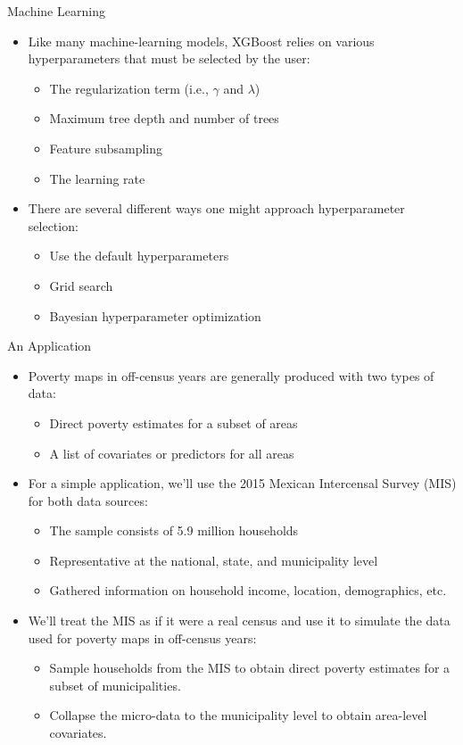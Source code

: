 \documentclass[aspectratio=169, xcolor=dvipsnames]{beamer}
\begin{document}
\begin{frame}{Machine Learning}
\begin{itemize}
\item Like many machine-learning models, XGBoost relies on various 
hyperparameters that must be selected by the user:
\begin{itemize}
\item The regularization term (i.e., $\gamma$ and $\lambda$)
\item Maximum tree depth and number of trees
\item Feature subsampling
\item The learning rate
\end{itemize}
\pause
\item There are several different ways one might approach hyperparameter selection:
\begin{itemize}
\item Use the default hyperparameters
\item Grid search
\item Bayesian hyperparameter optimization
\end{itemize}
\end{itemize}
\end{frame}

\begin{frame}{An Application}
\begin{itemize}
\item Poverty maps in off-census years are generally produced with two types
of data:
\begin{itemize}
\item Direct poverty estimates for a subset of areas
\item A list of covariates or predictors for all areas
\end{itemize}
\pause
\item For a simple application, we'll use the 2015 Mexican Intercensal Survey (MIS)
for both data sources:
\begin{itemize}
\item The sample consists of 5.9 million households
\item Representative at the national, state, and municipality level
\item Gathered information on household income, location, demographics, etc.
\end{itemize}
\pause
\item We'll treat the MIS as if it were a real census and use it to simulate the
data used for poverty maps in off-census years:
\begin{itemize}
\item Sample households from the MIS to obtain direct poverty estimates for a 
subset of municipalities.
\item Collapse the micro-data to the municipality level to obtain area-level covariates.
\end{itemize}
\end{itemize}
\end{frame}
\end{document}

